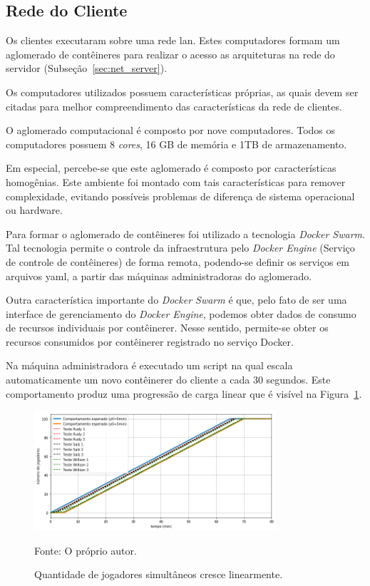 \subsection{Rede do Cliente}
\label{sec:net_cliente}


Os clientes executaram sobre uma rede \ac{lan}.
%
Estes computadores formam um aglomerado de contêineres para realizar o acesso as arquiteturas na rede do servidor (Subseção~\ref{sec:net_server}).

Os computadores utilizados possuem características próprias, as quais devem ser citadas para melhor compreendimento das características da rede de clientes.

O aglomerado computacional é composto por nove computadores.
%
Todos os computadores possuem 8 \textit{cores}, 16 GB de memória e 1TB de armazenamento.

Em especial, percebe-se que este aglomerado é composto por características homogênias.
%
Este ambiente foi montado com tais características para remover complexidade, evitando possíveis problemas de diferença de sistema operacional ou hardware.

Para formar o aglomerado de contêineres foi utilizado a tecnologia \textit{Docker Swarm}.
%
Tal tecnologia permite o controle da infraestrutura pelo \textit{Docker Engine} (Serviço de controle de contêineres) de forma remota, podendo-se definir os serviços em arquivos \ac{yaml}, a partir das máquinas administradoras do aglomerado.

Outra característica importante do \textit{Docker Swarm} é que, pelo fato de ser uma interface de gerenciamento do \textit{Docker Engine}, podemos obter dados de consumo de recursos individuais por contêinerer.
%
Nesse sentido, permite-se obter os recursos consumidos por contêinerer registrado no serviço Docker.

Na máquina administradora é executado um script na qual escala automaticamente um novo contêinerer do cliente a cada 30 segundos.
%
Este comportamento produz uma progressão de carga linear que é visível na Figura~\ref{fig:cliente_linear}.

\begin{figure}[htb!]
  \caption{Quantidade de jogadores simultâneos cresce linearmente.}
  \label{fig:cliente_linear}
  \includegraphics[width=0.8\textwidth]{figuras/network/clientes_script.png}
  \centering

  Fonte: O próprio autor.
\end{figure}

